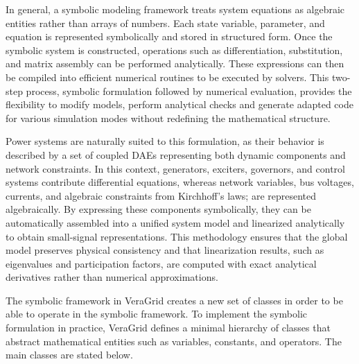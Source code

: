 In general, a symbolic modeling framework treats system equations as algebraic entities rather than arrays of numbers. Each state variable, parameter, and equation
is represented symbolically and stored in structured form. Once the symbolic system is constructed, operations such as differentiation, substitution, and matrix assembly
can be performed analytically. These expressions can then be compiled into efficient numerical routines to be executed by solvers. 
This two-step process, symbolic formulation followed by numerical evaluation, provides the flexibility to modify models, perform analytical checks
and generate adapted code for various simulation modes without redefining the mathematical structure.

Power systems are naturally suited to this formulation, as their behavior is described by a set of coupled DAEs representing both dynamic components and network constraints.
In this context, generators, exciters, governors, and control systems contribute differential equations, whereas network variables, bus voltages, currents, and algebraic 
constraints from Kirchhoff's laws; are represented algebraically. By expressing these components symbolically, they can be automatically assembled into a unified 
system model and linearized analytically to obtain small-signal representations. This methodology ensures that the global model preserves physical consistency and that 
linearization results, such as eigenvalues and participation factors, are computed with exact analytical derivatives rather than numerical approximations.

The symbolic framework in VeraGrid creates a new set of classes in order to be able to operate in the symbolic framework. To implement the symbolic formulation in practice, VeraGrid defines a minimal hierarchy
 of classes that abstract mathematical entities such as variables, constants, and operators. The main classes are stated below.

